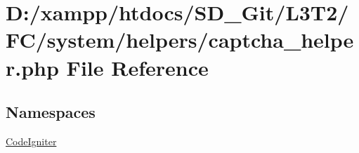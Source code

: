 \hypertarget{captcha__helper_8php}{}\section{D\+:/xampp/htdocs/\+S\+D\+\_\+\+Git/\+L3\+T2/\+F\+C/system/helpers/captcha\+\_\+helper.php File Reference}
\label{captcha__helper_8php}
\subsection*{Namespaces}
\begin{DoxyCompactItemize}
\item 
 \hyperlink{namespace_code_igniter}{Code\+Igniter}
\end{DoxyCompactItemize}
